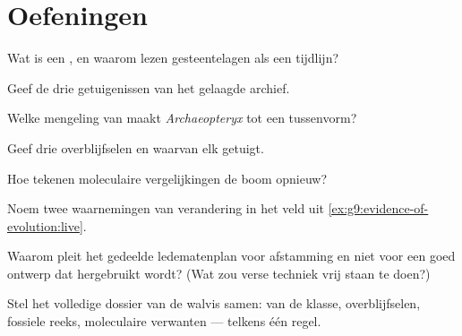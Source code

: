 \section{Oefeningen}

\begin{exercise}[$\star$]\label{exo:g9:evidence-of-evolution:1}
Wat is een , en waarom lezen gesteentelagen als een
tijdlijn?
\end{exercise}

\begin{exercise}[$\star$]\label{exo:g9:evidence-of-evolution:2}
Geef de drie getuigenissen van het gelaagde archief.
\end{exercise}

\begin{exercise}[$\star$]\label{exo:g9:evidence-of-evolution:3}
Welke mengeling van  maakt \emph{Archaeopteryx} tot een
tussenvorm?
\end{exercise}

\begin{exercise}[$\star$]\label{exo:g9:evidence-of-evolution:4}
Geef drie overblijfselen en waarvan elk getuigt.
\end{exercise}

\begin{exercise}[$\star$]\label{exo:g9:evidence-of-evolution:5}
Hoe tekenen moleculaire vergelijkingen de boom opnieuw?
\end{exercise}

\begin{exercise}[$\star$]\label{exo:g9:evidence-of-evolution:6}
Noem twee waarnemingen van verandering in het veld uit
\cref{ex:g9:evidence-of-evolution:live}.
\end{exercise}

\begin{exercise}[$\star\star$]\label{exo:g9:evidence-of-evolution:7}
Waarom pleit het gedeelde ledematenplan voor afstamming en niet
voor een goed ontwerp dat hergebruikt wordt? (Wat zou verse
techniek vrij staan te doen?)
\end{exercise}

\begin{exercise}[$\star\star$]\label{exo:g9:evidence-of-evolution:8}
Stel het volledige dossier van de walvis samen:  van de
klasse, overblijfselen, fossiele reeks, moleculaire verwanten ---
telkens één regel.
\end{exercise}


